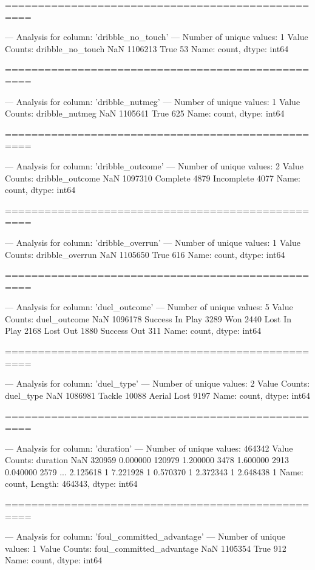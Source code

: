 ==================================================

--- Analysis for column: 'dribble_no_touch' ---
Number of unique values: 1
Value Counts:
dribble_no_touch
NaN     1106213
True         53
Name: count, dtype: int64

==================================================

--- Analysis for column: 'dribble_nutmeg' ---
Number of unique values: 1
Value Counts:
dribble_nutmeg
NaN     1105641
True        625
Name: count, dtype: int64

==================================================

--- Analysis for column: 'dribble_outcome' ---
Number of unique values: 2
Value Counts:
dribble_outcome
NaN           1097310
Complete         4879
Incomplete       4077
Name: count, dtype: int64

==================================================

--- Analysis for column: 'dribble_overrun' ---
Number of unique values: 1
Value Counts:
dribble_overrun
NaN     1105650
True        616
Name: count, dtype: int64

==================================================

--- Analysis for column: 'duel_outcome' ---
Number of unique values: 5
Value Counts:
duel_outcome
NaN                1096178
Success In Play       3289
Won                   2440
Lost In Play          2168
Lost Out              1880
Success Out            311
Name: count, dtype: int64

==================================================

--- Analysis for column: 'duel_type' ---
Number of unique values: 2
Value Counts:
duel_type
NaN            1086981
Tackle           10088
Aerial Lost       9197
Name: count, dtype: int64

==================================================

--- Analysis for column: 'duration' ---
Number of unique values: 464342
Value Counts:
duration
NaN         320959
0.000000    120979
1.200000      3478
1.600000      2913
0.040000      2579
             ...  
2.125618         1
7.221928         1
0.570370         1
2.372343         1
2.648438         1
Name: count, Length: 464343, dtype: int64

==================================================

--- Analysis for column: 'foul_committed_advantage' ---
Number of unique values: 1
Value Counts:
foul_committed_advantage
NaN     1105354
True        912
Name: count, dtype: int64

